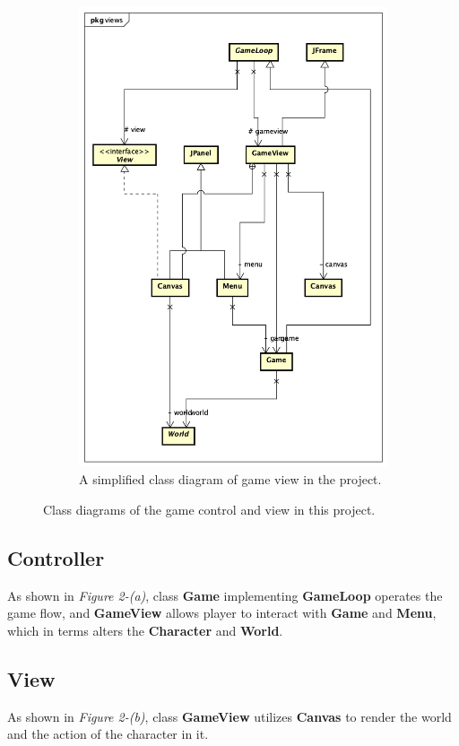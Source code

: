 \begin{figure}[h!]
\begin{subfigure}{.5\textwidth}
  \includegraphics[width=.9\linewidth]{View_Class_Diagram}  
  \caption{A simplified class diagram of game view in the project.}
  \label{fig:sub-second}
\end{subfigure}
\caption{Class diagrams of the game control and view in this project.}
\end{figure}

\subsection{Controller}
As shown in \textit{Figure 2-(a)}, class \textbf{Game} implementing \textbf{GameLoop} operates the game flow, and \textbf{GameView} allows player to interact with \textbf{Game} and \textbf{Menu}, which in terms alters the \textbf{Character} and \textbf{World}.

\subsection{View}
As shown in \textit{Figure 2-(b)}, class \textbf{GameView} utilizes \textbf{Canvas} to render the world and the action of the character in it.
